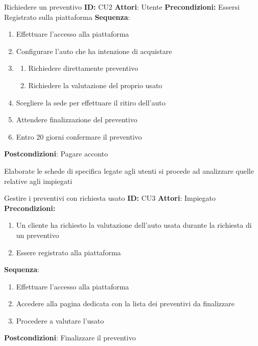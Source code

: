 \documentclass[a4paper, 11pt,oneside,]{book}
\newcommand{\spacing}{\par\bigskip\noindent}
\begin{document}
        \begin{mybox}{Richiedere un preventivo}
            \textbf{ID:} CU2
            \tcbline
            \textbf{Attori}: Utente
            \tcbline
            \textbf{Precondizioni:} Essersi Registrato sulla piattaforma
            \tcbline
            \textbf{Sequenza}: 
            \begin{enumerate}
                \item Effettuare l'accesso alla piattaforma
                \item Configurare l'auto che ha intenzione di acquistare
                \item
                \begin{enumerate}
                    \item Richiedere direttamente preventivo
                    \item Richiedere la valutazione del proprio usato 
                \end{enumerate}
                \item Scegliere la sede per effettuare il ritiro dell'auto
                \item Attendere finalizzazione del preventivo
                \item Entro 20 giorni confermare il preventivo
            \end{enumerate}
            \tcbline
            \textbf{Postcondizioni}: Pagare acconto
        \end{mybox}
        \spacing
        Elaborate le schede di specifica legate agli utenti si procede ad analizzare quelle relative agli impiegati
        \begin{mybox}{Gestire i preventivi con richiesta usato}
            \textbf{ID:} CU3
            \tcbline
            \textbf{Attori}: Impiegato
            \tcbline
            \textbf{Precondizioni:} \begin{enumerate}
                \item Un cliente ha richiesto la valutazione dell'auto usata durante la richiesta di un preventivo
                \item Essere registrato alla piattaforma
                \tcbline
            \end{enumerate} 
            \textbf{Sequenza}: 
            \begin{enumerate}
                \item Effettuare l'accesso alla piattaforma
                \item Accedere alla pagina dedicata con la lista dei preventivi da finalizzare
                \item Procedere a valutare l'usato
            \end{enumerate}
            \tcbline
            \textbf{Postcondizioni}: Finalizzare il preventivo
        \end{mybox}
\end{document}
